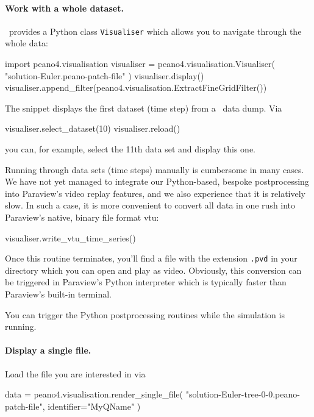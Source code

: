 \paragraph{Work with a whole dataset.}
%
%
%
\Peano\ provides a Python class \texttt{Visualiser} which allows you to navigate through the whole data:
\begin{code}
import peano4.visualisation
visualiser = peano4.visualisation.Visualiser( "solution-Euler.peano-patch-file" )
visualiser.display()
visualiser.append_filter(peano4.visualisation.ExtractFineGridFilter())
\end{code}

\noindent
The snippet displays the first dataset (time step) from a \Peano\ data dump.
Via 
\begin{code}
visualiser.select_dataset(10)
visualiser.reload()
\end{code}
you can, for example, select the 11th data set and display this one.


Running through data sets (time steps) manually is cumbersome in many cases.
We have not yet managed to integrate our Python-based, bespoke postprocessing
into Paraview's video replay features, and we also experience that it is relatively 
slow.
In such a case, it is more convenient to convert all data in one rush 
into Paraview's native, binary file format vtu:
\begin{code}
visualiser.write_vtu_time_series()
\end{code}


\noindent
Once this routine terminates, you'll find a file with the extension \texttt{.pvd}
in your directory which you can open and play as video.
Obviously, this conversion can be triggered in Paraview's Python interpreter 
which is typically faster than Paraview's built-in terminal.

\begin{remark}
 You can trigger the Python postprocessing routines while the simulation is running.
\end{remark}



\paragraph{Display a single file.}
%
%
Load the file you are interested in via
\begin{code}
data = peano4.visualisation.render_single_file(  "solution-Euler-tree-0-0.peano-patch-file", identifier="MyQName" )
\end{code}


